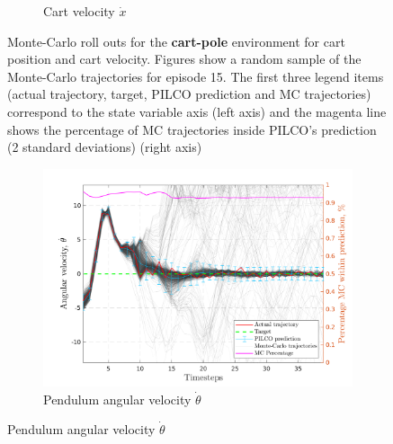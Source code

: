 \begin{figure}[htp!]
\begin{subfigure}[b]{1\linewidth}
    \caption{Cart velocity $\dot x$} 
    \label{Fig:Re-cp-cart-velocity} 
  \end{subfigure} 
\caption[Monte-Carlo roll outs for \textbf{cart-pole} cart position and cart velocity]{Monte-Carlo roll outs for the \textbf{cart-pole} environment for cart position and cart velocity. Figures show a random sample of the Monte-Carlo trajectories for episode 15. The first three legend items (actual trajectory, target, PILCO prediction and MC trajectories) correspond to the state variable axis (left axis) and the magenta line shows the percentage of MC trajectories inside PILCO's prediction (2 standard deviations) (right axis)}
\label{Re:cp-MC-roll-outs-1} 
\end{figure}
 
 
\begin{figure}[htp!]    
  \begin{subfigure}[b]{1\linewidth}
    \centering
    \includegraphics[height=0.4\textheight,width=1\textwidth]{Chapter3/Figures/cp_MC_rollout_Ep_15_Dim_3.png} 
    \caption{Pendulum angular velocity $\dot \theta$} 
    \label{Fig:Re-cp-pen-velocity} 
  \end{subfigure} 


\end{figure}
